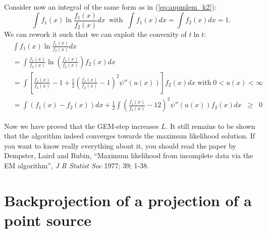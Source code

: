 \documentclass[11pt,oneside]{book}
\begin{document}
Consider now an integral of the same form as in (\ref{eq:appmlem_k2}):
\begin{equation}
  \int f_1(x) \ln \frac{f_1(x)}{f_2(x)} dx \;\; \mbox{with} \;\;
  \int f_1(x) dx = \int f_2(x) dx = 1.
\end{equation}
We can rework it such that we can exploit the convexity of $t \ln t$:
\begin{align}
  &  \int f_1(x) \ln \frac{f_1(x)}{f_2(x)} dx \nonumber\\
  &= \int \frac{f_1(x)}{f_2(x)} \ln \left( \frac{f_1(x)}{f_2(x)} \right)
        f_2(x) dx \nonumber\\
  &= \int \left[ \frac{f_1(x)}{f_2(x)} -1 + 
       \frac{1}{2}\left( \frac{f_1(x)}{f_2(x)} - 1\right)^2 
        \psi''(u(x)) \right]  f_2(x) dx \; \mbox{with} \; 0 < u(x) < \infty 
        \nonumber\\
  &= \int \left( f_1(x) - f_2(x) \right) dx + 
        \frac{1}{2} \int \left( \frac{f_1(x)}{f_2(x)} - 1 2\right)^2
        \psi''(u(x)) f_2(x) dx \;\; \geq \;\; 0
\end{align}

Now we have proved that the GEM-step increases $L$. It still remains
to be shown that the algorithm indeed converges towards the maximum
likelihood solution. If you want to know really everything about it, you
should read the paper by Dempster, Laird and Rubin, ``Maximum
likelihood from incomplete data via the EM algorithm'', {\em J R
Statist Soc} 1977; 39; 1-38.


\newpage
\section{Backprojection of a projection of a point source} \label{app:bprojproj}
\end{document}
